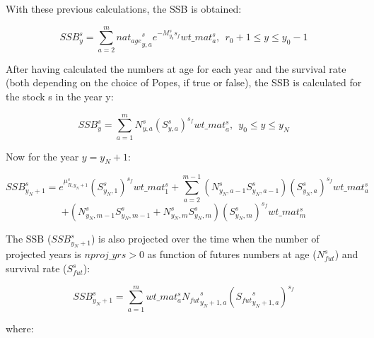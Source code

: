 \documentclass{article}
\begin{document}
With these previous calculations, the SSB is obtained:

\begin{equation}
    SSB^s_y=\sum_{a=2}^{m}{nat_{age}}_{y,a}^s e^{-M^s_{y_0}s_f} wt\_{mat}^s_a, \ \ r_0 + 1 \leq y \leq y_0 - 1
\end{equation}

After having calculated the numbers at age for each year and the survival rate (both depending on the choice of Popes, if true or false), the SSB is calculated for the stock s in the year y:

\begin{equation}
SSB^s_y=\sum_{a=1}^{m}N^s_{y,a}{(S^s_{y,a})}^{s_f}{wt\_{mat}}^s_a, \ \ y_0 \leq y \leq y_N
\end{equation}


Now for the year $y=y_N+1$:

\begin{equation}
    SSB^s_{y_N+1}=e^{\mu^s_{R,y_N+1}}(S^{s}_{y_N,1})^{s_f}{wt\_{mat}}^s_1+\sum_{a=2}^{m-1}(N^{s}_{y_N,a-1}S^{s}_{y_N,a-1})(S^s_{y_N,a})^{s_f}wt\_{mat}^s_a
\end{equation}
\begin{equation*}
 +(N^{s}_{y_N,m-1}S^s_{y_N,m-1}+N^s_{y_N,m}S^s_{y_N,m})(S^s_{y_N,m})^{s_f}wt\_{mat}^s_{m}
\end{equation*}

The SSB ($SSB^s_{y_N+1}$) is also projected over the time when the number of projected years is $nproj\_yrs>0$ as function of futures numbers at age ($N^s_{fut}$) and survival rate ($S^s_{fut}$): 

\begin{equation}
    SSB^s_{y_N+1}= \sum_{a=1}^m wt\_{mat}^s_a{N_{fut}}^s_{y_N+1,a}({{S_{fut}}^s_{y_N+1,a}})^{s_f}
\end{equation}

where: 
\end{document}
